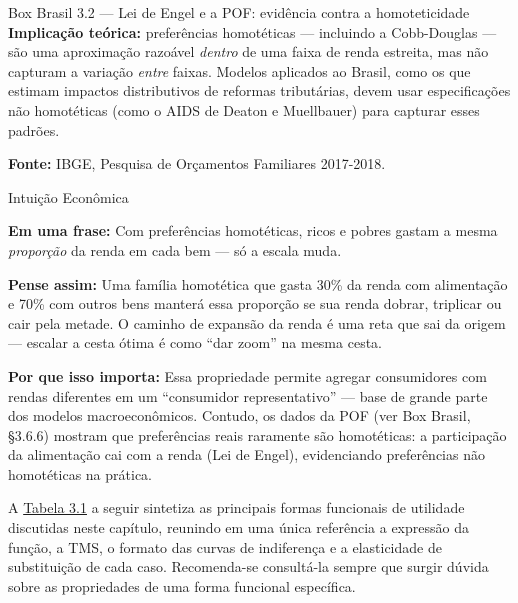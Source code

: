\documentclass[11pt,twoside,openright]{book}
\begin{document}
\begin{boxbrasilbox}{Box Brasil 3.2 — Lei de Engel e a POF: evidência contra a homoteticidade}
\textbf{Implicação teórica:} preferências homotéticas --- incluindo a
Cobb-Douglas --- são uma aproximação razoável \emph{dentro} de uma faixa
de renda estreita, mas não capturam a variação \emph{entre} faixas.
Modelos aplicados ao Brasil, como os que estimam impactos distributivos
de reformas tributárias, devem usar especificações não homotéticas (como
o AIDS de Deaton e Muellbauer) para capturar esses padrões.

\textbf{Fonte:} IBGE, Pesquisa de Orçamentos Familiares 2017-2018.

\end{boxbrasilbox}

\begin{intuitionbox}{Intuição Econômica}

\textbf{Em uma frase:} Com preferências homotéticas, ricos e pobres
gastam a mesma \emph{proporção} da renda em cada bem --- só a escala
muda.

\textbf{Pense assim:} Uma família homotética que gasta 30\% da renda com
alimentação e 70\% com outros bens manterá essa proporção se sua renda
dobrar, triplicar ou cair pela metade. O caminho de expansão da renda é
uma reta que sai da origem --- escalar a cesta ótima é como ``dar zoom''
na mesma cesta.

\textbf{Por que isso importa:} Essa propriedade permite agregar
consumidores com rendas diferentes em um ``consumidor representativo''
--- base de grande parte dos modelos macroeconômicos. Contudo, os dados
da POF (ver Box Brasil, §3.6.6) mostram que preferências reais raramente
são homotéticas: a participação da alimentação cai com a renda (Lei de
Engel), evidenciando preferências não homotéticas na prática.

\end{intuitionbox}

A \hyperref[tabela-3-1]{Tabela 3.1} a seguir sintetiza as principais
formas funcionais de utilidade discutidas neste capítulo, reunindo em
uma única referência a expressão da função, a TMS, o formato das curvas
de indiferença e a elasticidade de substituição de cada caso.
Recomenda-se consultá-la sempre que surgir dúvida sobre as propriedades
de uma forma funcional específica.
\end{document}
